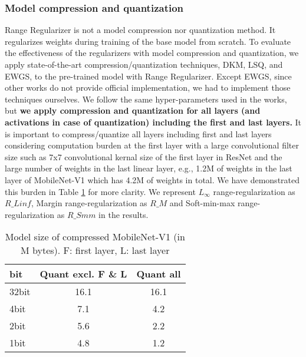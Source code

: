 \documentclass[10pt,twocolumn,letterpaper]{article}
\begin{document}
\subsubsection{Model compression and quantization}
Range Regularizer is not a model compression nor quantization method. It regularizes weights during training of the base model from scratch. To evaluate the effectiveness of the regularizers with model compression and quantization, we apply state-of-the-art compression/quantization techniques, DKM\cite{cho2021dkm}, LSQ\cite{esser2019learned}, and EWGS\cite{lee2021network}, to the pre-trained model with Range Regularizer. 
Except EWGS, since other works do not provide official implementation, we had to implement those techniques ourselves. We follow the same hyper-parameters used in the works, but \textbf{we apply compression and quantization for all layers (and activations in case of quantization) including the first and last layers.} It is important to compress/quantize all layers including first and last layers considering computation burden at the first layer with a large convolutional filter size such as 7x7 convolutional kernal size of the first layer in ResNet and the large number of weights in the last linear layer, e.g., 1.2M of weights in the last layer of MobileNet-V1 which has 4.2M of weights in total. We have demonstrated this burden in Table \ref{table_model_size} for more clarity. We represent $L_\infty$ range-regularization as $R\_Linf$, Margin range-regularization as $R\_M$ and Soft-min-max range-regularization as $R\_Smm$ in the results.
\begin{table}[t]
\caption{Model size of compressed MobileNet-V1 (in M bytes). F: first layer, L: last layer} \label{table_model_size}
\vskip 0.15in
\begin{center}
\begin{small}
\begin{sc}



\begin{tabular}{lcc}
\toprule
bit & Quant excl. F \& L & Quant all \\
\midrule
32bit & 16.1   & 16.1 \\
\midrule
4bit & 7.1   & 4.2 \\
2bit & 5.6   & 2.2 \\
1bit & 4.8   & 1.2 \\
\bottomrule
\end{tabular}
\end{sc}
\end{small}
\end{center}
\vskip -0.1in
\end{table}
\end{document}
